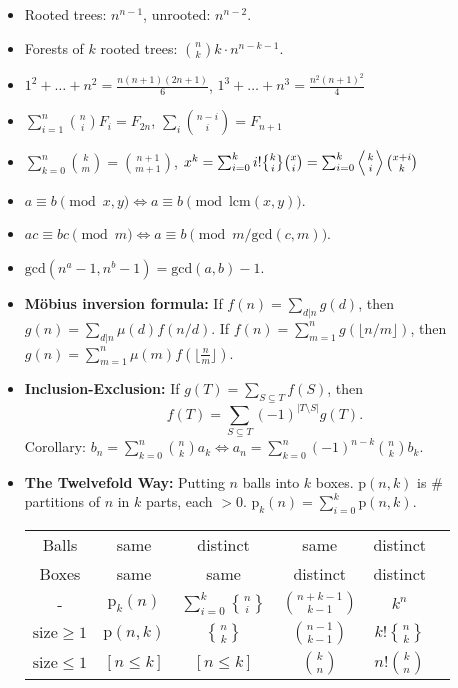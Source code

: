 \documentclass[8pt,a4paper,landscape,oneside]{amsart}
\DeclareRobustCommand{\stirling}{\genfrac\{\}{0pt}{}}
\newenvironment{myitemize}
{\begin{itemize}[leftmargin=.3cm]
	\setlength{\itemsep}{0pt}
	\setlength{\parskip}{0pt}
	\setlength{\parsep}{0pt}     }
{ \end{itemize}                  }
\begin{document}
\begin{multicols*}{3}
\begin{myitemize}
	\item Rooted trees: $n^{n-1}$, unrooted: $n^{n-2}$.
	\item Forests of $k$ rooted trees: $\binom{n}{k} k \cdot n^{n-k-1}$.
	\item $1^2 + \dots + n^2 = \frac{n(n+1)(2n+1)}{6}$, \quad $1^3 + \dots + n^3 = \frac{n^2(n+1)^2}{4}$ \\
	\item $\sum_{i=1}^n \binom{n}{i} F_i = F_{2n}$, \quad $\sum_{i} \binom{n-i}{i} = F_{n+1}$
	\item $\sum_{k=0}^n \binom{k}{m} = \binom{n+1}{m+1}$, \quad $x^k = \sum_{i=0}^k i!\stirling{k}{i}\binom{x}{i} = \sum_{i=0}^k \left\langle {k \atop i} \right\rangle\binom{x+i}{k}$
	\item $a\equiv b \pmod{x,y} \Leftrightarrow a \equiv b \pmod{\mathrm{lcm}(x,y)}$.
	\item $ac \equiv bc \pmod{m} \Leftrightarrow a \equiv b \pmod{m/\mathrm{gcd}(c,m)}$.
	\item $\mathrm{gcd}(n^a-1,n^b-1) = \mathrm{gcd}(a,b)-1$.
	\item \textbf{Möbius inversion formula:} If $f(n) = \sum_{d|n} g(d)$, then $g(n) = \sum_{d|n} \mu(d) f(n/d)$. If $f(n) = \sum_{m=1}^n g(\lfloor n/m\rfloor)$, then $g(n) = \sum_{m=1}^n \mu(m)f(\lfloor\frac{n}{m}\rfloor)$.
	\item \textbf{Inclusion-Exclusion:} If $g(T) = \sum_{S \subseteq T} f(S)$, then
	\[
		f(T) = \sum_{S \subseteq T} (-1)^{\lvert T \setminus S \rvert} g(T).
	\]
	Corollary:
		$b_n = \sum_{k=0}^{n} \binom{n}{k} a_k \Longleftrightarrow a_n = \sum_{k=0}^{n} (-1)^{n-k} \binom{n}{k} b_k$.

	\item \textbf{The Twelvefold Way:}
Putting $n$ balls into $k$ boxes.
$\mathrm{p}(n,k)$ is \# partitions of $n$ in $k$ parts, each $>0$.
$\mathrm{p}_k(n) = \sum_{i=0}^k \mathrm{p}(n,k)$.

\begin{tabular}{@{}c|c|c|c|c|l@{}}
	Balls & same & distinct & same & distinct\\
	Boxes & same & same & distinct & distinct\\
	\hline
	- & $\mathrm{p}_k(n)$ & $\sum_{i=0}^k \stirling{n}{i}$ & $\binom{n+k-1}{k-1}$ & $k^n$ \\
	$\mathrm{size}\ge 1$ & $\mathrm{p}(n,k)$ & $\stirling{n}{k}$ & $\binom{n-1}{k-1}$ & $k!\stirling{n}{k}$ \\
	$\mathrm{size}\le 1$ & $[n \le k]$ & $[n \le k]$ & $\binom{k}{n}$ & $n!\binom{k}{n}$ \\
	\bottomrule
\end{tabular}


\end{myitemize}
\end{multicols*}
\end{document}
